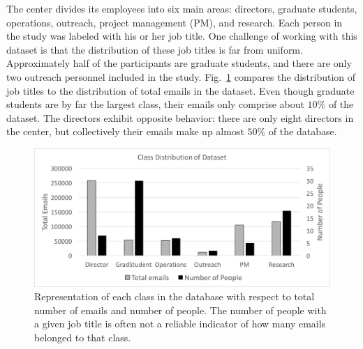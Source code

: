 \documentclass[10pt,twocolumn,conference]{IEEEtran}
\begin{document}
\begin{table}[t]
\centering
\caption{A comparison between the internal dataset and the Enron email corpus.}
\label{tab:db_stats}
\end{table}


The center divides its employees into six main areas: directors, graduate students, operations, outreach, project management (PM), and research.
Each person in the study was labeled with his or her job title.
One challenge of working with this dataset is that the distribution of these job titles is far from uniform.
Approximately half of the participants are graduate students, and there are only two outreach personnel included in the study.
Fig.~\ref{fig:db_bar} compares the distribution of job titles to the distribution of total emails in the dataset.
Even though graduate students are by far the largest class, their emails only comprise about $10\%$ of the dataset.
The directors exhibit opposite behavior: there are only eight directors in the center, but collectively their emails make up almost $50\%$ of the database.

\begin{figure}[t]
	\centering
	\includegraphics[width=\columnwidth,trim={1mm 5mm 1mm 5mm},clip]{DatasetStatsBar_BW}
	\caption{Representation of each class in the database with respect to total number of emails and number of people.  The number of people with a given job title is often not a reliable indicator of how many emails belonged to that class.}
	\label{fig:db_bar}
\end{figure}
\end{document}

